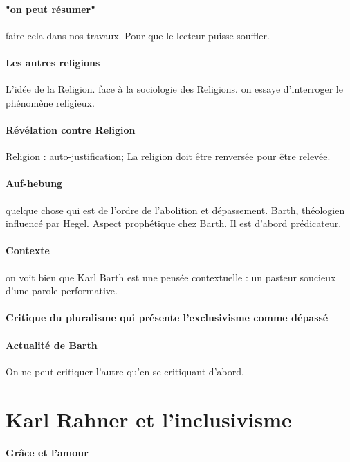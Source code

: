 \paragraph{"on peut résumer"} faire cela dans nos travaux. Pour que le lecteur puisse souffler. 

\paragraph{Les autres religions} L'idée de la Religion. face à la sociologie des Religions. on essaye d'interroger le phénomène religieux.

\paragraph{Révélation contre Religion} Religion : auto-justification; La religion doit être renversée pour être relevée. 

\paragraph{Auf-hebung} quelque chose qui est de l'ordre de l'abolition et dépassement. Barth, théologien influencé par Hegel. Aspect prophétique chez Barth. Il est d'abord prédicateur. 

\paragraph{Contexte} on voit bien que Karl Barth est une pensée contextuelle : un pasteur soucieux d'une parole performative. 

\paragraph{Critique du pluralisme qui présente l'exclusivisme comme dépassé}

\paragraph{Actualité de Barth} On ne peut critiquer l'autre qu'en se critiquant d'abord.

\section{Karl Rahner et l'inclusivisme}

\paragraph{Grâce et l'amour}

